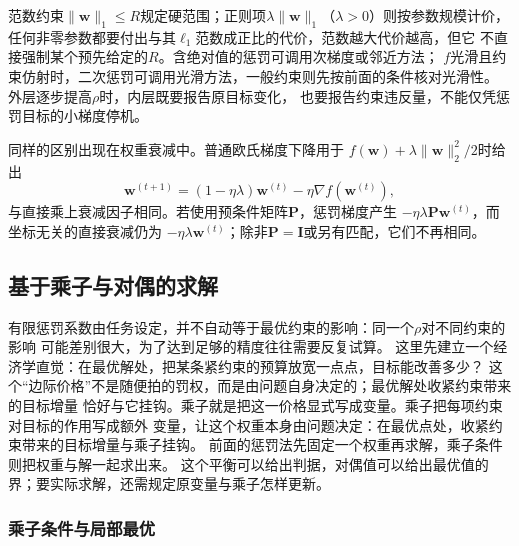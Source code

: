 范数约束$\|\bm w\|_1\leq R$规定硬范围；正则项$\lambda\|\bm w\|_1$（$\lambda>0$）则按参数规模计价，
任何非零参数都要付出与其$\ell_1$范数成正比的代价，范数越大代价越高，但它
不直接强制某个预先给定的$R$。含绝对值的惩罚可调用次梯度或邻近方法；
$f$光滑且约束仿射时，二次惩罚可调用光滑方法，一般约束则先按前面的条件核对光滑性。
外层逐步提高$\rho$时，内层既要报告原目标变化，
也要报告约束违反量，不能仅凭惩罚目标的小梯度停机。

同样的区别出现在权重衰减中。普通欧氏梯度下降用于
$f(\bm{w})+\lambda\lVert\bm{w}\rVert_2^2/2$时给出
\[
  \bm{w}^{(t+1)}
  =(1-\eta\lambda)\bm{w}^{(t)}-\eta\nabla f(\bm{w}^{(t)}),
\]
与直接乘上衰减因子相同。若使用预条件矩阵$\bm{P}$，惩罚梯度产生
$-\eta\lambda\bm{P}\bm{w}^{(t)}$，而坐标无关的直接衰减仍为
$-\eta\lambda\bm{w}^{(t)}$；除非$\bm{P}=\bm{I}$或另有匹配，它们不再相同。

\subsection{基于乘子与对偶的求解}
\label{sec:opt-multiplier-dual-methods}

有限惩罚系数由任务设定，并不自动等于最优约束的影响：同一个$\rho$对不同约束的影响
可能差别很大，为了达到足够的精度往往需要反复试算。
这里先建立一个经济学直觉：在最优解处，把某条紧约束的预算放宽一点点，目标能改善多少？
这个“边际价格”不是随便拍的罚权，而是由问题自身决定的；最优解处收紧约束带来的目标增量
恰好与它挂钩。乘子就是把这一价格显式写成变量。乘子把每项约束对目标的作用写成额外
变量，让这个权重本身由问题决定：在最优点处，收紧约束带来的目标增量与乘子挂钩。
前面的惩罚法先固定一个权重再求解，乘子条件则把权重与解一起求出来。
这个平衡可以给出判据，对偶值可以给出最优值的界；要实际求解，还需规定原变量与乘子怎样更新。

\subsubsection{乘子条件与局部最优}
\label{sec:opt-kkt}

